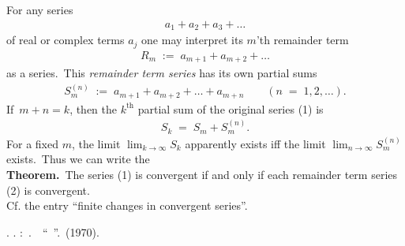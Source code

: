 \documentclass[12pt]{article}
\theoremstyle{definition}
\begin{document}
For any series
\begin{align}
a_1+a_2+a_3+\ldots
\end{align}
of real or complex terms $a_j$ one may interpret its $m$'th 
remainder term 
\begin{align}
R_m \;:=\; a_{m+1}+a_{m+2}+\ldots
\end{align}
as a series.\, This {\it remainder term series} has its own 
partial sums
\begin{align}
S_m^{(n)}\;:=\; a_{m+1}+a_{m+2}+\ldots+a_{m+n} \qquad 
(n \;=\; 1,2,\ldots).
\end{align}
If\, $m+n =k$, then the $k^{\mathrm{th}}$ partial sum of the original series (1) 
is
\begin{align}
S_k \;=\; S_m+S_m^{(n)}.
\end{align}
For a fixed $m$, the limit $\lim_{k\to\infty}S_k$ apparently 
exists iff the limit 
$\lim_{n\to\infty}S_m^{(n)}$ exists.\, Thus we can write the\\
\textbf{Theorem.}\, The series (1) is convergent if and only if 
each remainder term series (2) is convergent.\\

Cf. the entry ``finite changes in convergent series''.


\begin{thebibliography}{9}
 \CYRL. \CYRD. 
\CYRK\cyru\cyrd\cyrr\cyrya\cyrv\cyrc\cyre\cyrv:
\emph{\CYRM\cyra\cyrt\cyre\cyrm\cyra\cyrt\cyri\cyrch\cyre\cyrs\cyrk\cyri\cyrishrt\,\cyra\cyrn\cyra\cyrl\cyri\cyrz}.\,\CYRI\cyrz\cyrd\cyra\cyrt\cyre\cyrl\cyrsftsn\cyrs\cyrt\cyrv\cyro 
\, ``\CYRV\cyrery\cyrs\cyrsh\cyra\cyrya \, \cyrsh\cyrk\cyro\cyrl\cyra''. 
\CYRM\cyro\cyrs\cyrk\cyrv\cyra \,(1970).
\end{thebibliography} \\
\end{document}
